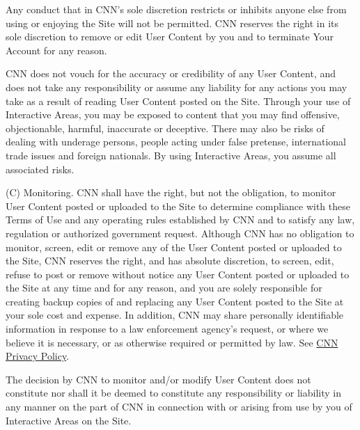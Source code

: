 Any conduct that in CNN's sole discretion restricts or inhibits anyone
else from using or enjoying the Site will not be permitted. CNN reserves
the right in its sole discretion to remove or edit User Content by you
and to terminate Your Account for any reason.

CNN does not vouch for the accuracy or credibility of any User Content,
and does not take any responsibility or assume any liability for any
actions you may take as a result of reading User Content posted on the
Site. Through your use of Interactive Areas, you may be exposed to
content that you may find offensive, objectionable, harmful, inaccurate
or deceptive. There may also be risks of dealing with underage persons,
people acting under false pretense, international trade issues and
foreign nationals. By using Interactive Areas, you assume all associated
risks.

(C) Monitoring. CNN shall have the right, but not the obligation, to
monitor User Content posted or uploaded to the Site to determine
compliance with these Terms of Use and any operating rules established
by CNN and to satisfy any law, regulation or authorized government
request. Although CNN has no obligation to monitor, screen, edit or
remove any of the User Content posted or uploaded to the Site, CNN
reserves the right, and has absolute discretion, to screen, edit, refuse
to post or remove without notice any User Content posted or uploaded to
the Site at any time and for any reason, and you are solely responsible
for creating backup copies of and replacing any User Content posted to
the Site at your sole cost and expense. In addition, CNN may share
personally identifiable information in response to a law enforcement
agency's request, or where we believe it is necessary, or as otherwise
required or permitted by law. See \href{http://www.cnn.com/privacy}{CNN
Privacy Policy}.

The decision by CNN to monitor and/or modify User Content does not
constitute nor shall it be deemed to constitute any responsibility or
liability in any manner on the part of CNN in connection with or arising
from use by you of Interactive Areas on the Site.

